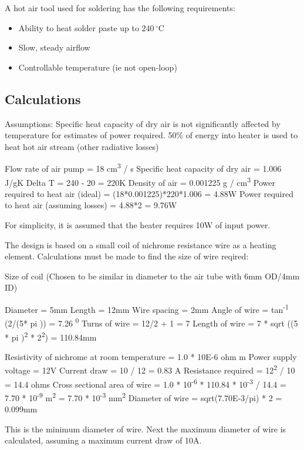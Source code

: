 \documentclass[a4paper,11pt]{article}  %
\begin{document}
A hot air tool used for soldering has the following requirements:

\begin{itemize} \itemsep0em
	\item	Ability to heat solder paste up to $240\,^{\circ}\mathrm{C}$
	\item	Slow, steady airflow
	\item	Controllable temperature (ie not open-loop)
\end{itemize}

\subsection{Calculations}

Assumptions:
Specific heat capacity of dry air is not significantly affected by temperature for estimates of power required.
50\% of energy into heater is used to heat hot air stream (other radiative losses)

Flow rate of air pump = 18 cm\textsuperscript{3} / s
Specific heat capacity of dry air = 1.006 J/gK
Delta T = 240 - 20 = 220K
Density of air = 0.001225 g / cm\textsuperscript{3}
Power required to heat air (ideal) = (18*0.001225)*220*1.006 = 4.88W
Power required to heat air (assuming losses) = 4.88*2 = 9.76W

For simplicity, it is assumed that the heater requires 10W of input power.

The design is based on a small coil of nichrome resistance wire as a heating element. Calculations must be made to find
the size of wire reqired:

Size of coil (Chosen to be similar in diameter to the air tube with 6mm OD/4mm ID)

Diameter = 5mm
Length = 12mm
Wire spacing = 2mm
Angle of wire = tan\textsuperscript{-1} (2/(5* pi )) = 7.26 \textsuperscript{0}
Turns of wire = 12/2 + 1 = 7
Length of wire = 7 * sqrt ((5 * pi )\textsuperscript{2}  * 2\textsuperscript{2}) =  110.84mm

Resistivity of nichrome at room temperature = 1.0 * 10E-6 ohm m 
Power supply voltage = 12V
Current draw = 10 / 12 = 0.83 A 
Resistance required = 12\textsuperscript{2} / 10 = 14.4 ohms
Cross sectional area of wire = 1.0 * 10\textsuperscript{-6} * 110.84 * 10\textsuperscript{-3} / 14.4 = 7.70 * 10\textsuperscript{-9} m\textsuperscript{2} = 7.70 * 10\textsuperscript{-3} mm\textsuperscript{2}
Diameter of wire = sqrt(7.70E-3/pi) * 2 = 0.099mm

This is the minimum diameter of wire. Next the maximum diameter of wire is calculated, assuming a maximum current draw of 10A.
\end{document}
